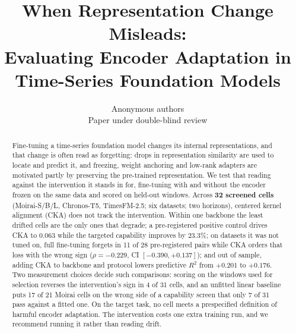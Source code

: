 \documentclass{article} %
\title{When Representation Change Misleads:\\
       Evaluating Encoder Adaptation in\\
       Time-Series Foundation Models}
\author{Anonymous authors\\
Paper under double-blind review}
\begin{document}
\maketitle

\begin{abstract}
Fine-tuning a time-series foundation model changes its internal representations,
and that change is often read as forgetting: drops in representation similarity
are used to locate and predict it, and freezing, weight anchoring and low-rank
adapters are motivated partly by preserving the pre-trained representation.  We
test that reading against the intervention it stands in for, fine-tuning with and
without the encoder frozen on the same data and scored on held-out windows.
Across \textbf{32 screened cells} (Moirai-S/B/L, Chronos-T5, TimesFM-2.5; six
datasets; two horizons), centered kernel alignment (CKA) does not track the
intervention.  Within one backbone the least drifted cells are the only ones that
degrade; a pre-registered positive control drives CKA to $0.063$ while the
targeted capability improves by $23.3\%$; on datasets it was not tuned on,
full fine-tuning forgets in 11 of 28 pre-registered pairs while CKA orders that
loss with the wrong sign ($\rho{=}{-}0.229$, CI $[-0.390,{+}0.137]$); and out of sample, adding CKA to backbone and protocol lowers
predictive $R^2$ from $+0.201$ to $+0.176$.  Two measurement choices decide such
comparisons: scoring on the windows used for selection reverses the
intervention's sign in 4 of 31 cells, and an unfitted linear baseline puts 17 of
21 Moirai cells on the wrong side of a capability screen that only 7 of 31 pass
against a fitted one.  On the target task, no cell meets a prespecified definition of harmful
encoder adaptation.  The intervention costs one extra training run, and we recommend
running it rather than reading drift.
\end{abstract}
\end{document}
